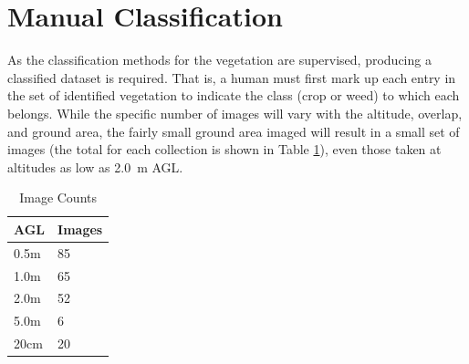 \documentclass[letterpaper]{article}
\begin{document}
{\section{Manual Classification}
As the classification methods for the vegetation are supervised, producing a classified dataset is required. That is, a human must first mark up each entry in the set of identified vegetation to indicate the class (crop or weed) to which each belongs.  While the specific number of images will vary with the altitude, overlap, and ground area, the fairly small ground area imaged will result in a small set of images (the total for each collection is shown in Table \ref{tab:acquisition}), even those taken at altitudes as low as \SI{2.0}{\meter} AGL.

\begin{table}
	\def\arraystretch{0.70}
	\caption{Image Counts}
 	\label{tab:acquisition}
 	\centering
 	\begin{tabular}[t]{ll} 
		\textbf{AGL} & \textbf{Images} \\
		\midrule
		      0.5m & 85  \\
		      1.0m & 65  \\
		      2.0m & 52 \\
		      5.0m & 6  \\
		      20cm & 20 
	\end{tabular}
\end{table}


}
\end{document}
